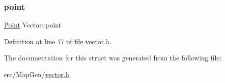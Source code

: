 \mbox{\label{struct_vector_a816252f9d4aa9c0c0d554449ebf8fe9d}} 
\subsubsection{\texorpdfstring{point}{point}}
{\footnotesize\ttfamily \mbox{\hyperlink{vector_8h_ac82aba4f8f70541442a30f1598bd0649}{Point}} Vector\+::point}



Definition at line 17 of file vector.\+h.



The documentation for this struct was generated from the following file\+:\begin{DoxyCompactItemize}
\item 
src/\+Map\+Gen/\mbox{\hyperlink{vector_8h}{vector.\+h}}\end{DoxyCompactItemize}
